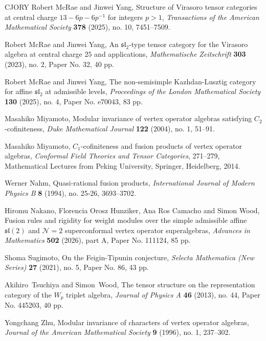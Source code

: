 \documentclass[11pt, reqno]{amsart}
\theoremstyle{definition}\newtheorem{defi}[thm]{Definition}
\theoremstyle{definition}\newtheorem{rem}[thm]{Remark}
\theoremstyle{definition}\newtheorem{exam}[thm]{Example}
\theoremstyle{definition}\newtheorem{assum}[thm]{Assumption}
\begin{document}
\begin{thebibliography}{CJORY}
Robert McRae and Jinwei Yang, Structure of Virasoro tensor categories at central charge $13-6p-6p^{-1}$ for integers $p>1$, \textit{Transactions of the American Mathematical Society} \textbf{378} (2025), no. 10, 7451--7509.

Robert McRae and Jinwei Yang,  An $\mathfrak{sl}_2$-type tensor category for the Virasoro algebra at central charge $25$ and applications, \textit{Mathematische Zeitschrift} \textbf{303} (2023), no. 2, Paper No. 32, 40 pp.

Robert McRae and Jinwei Yang, The non-semisimple Kazhdan-Lusztig category for affine $\mathfrak{sl}_2$ at admissible levels, \textit{Proceedings of the London Mathematical Society} \textbf{130} (2025), no. 4, Paper No. e70043, 83 pp.

Masahiko Miyamoto, Modular invariance of vertex operator algebras satisfying $C_2$-cofiniteness, \textit{Duke Mathematical Journal} \textbf{122} (2004), no. 1, 51--91.

Masahiko Miyamoto, $C_1$-cofiniteness and fusion products of vertex operator algebras, \textit{Conformal Field Theories and Tensor Categories}, 271--279, Mathematical Lectures from Peking University, Springer, Heidelberg, 2014.

Werner Nahm, Quasi-rational fusion products, \textit{International Journal of Modern Physics B} \textbf{8} (1994), no. 25-26, 3693--3702.

Hiromu Nakano, Florencia Orosz Hunziker, Ana Ros Camacho and Simon Wood, Fusion rules and rigidity for weight modules over the simple admissible affine $\mathfrak{sl}(2)$ and $\mathcal{N}=2$ superconformal vertex operator superalgebras,
\textit{Advances in Mathematics} \textbf{502} (2026), part A, Paper No. 111124, 85 pp.

Shoma Sugimoto, On the Feigin-Tipunin conjecture, \textit{Selecta Mathematica (New Series)} \textbf{27} (2021), no. 5, Paper No. 86, 43 pp.

Akihiro~Tsuchiya and Simon~Wood, The tensor structure on the representation category of the $W_p$ triplet algebra,  \textit{Journal of Physics A} \textbf{46} (2013), no. 44, Paper No. 445203, 40 pp. 

Yongchang Zhu, Modular invariance of characters of vertex operator algebras, \textit{Journal of the American Mathematical Society} \textbf{9} (1996), no. 1, 237--302. 

\end{thebibliography}
\end{document}
